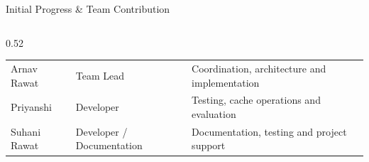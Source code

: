 \documentclass[aspectratio=169,10pt]{beamer}
\begin{document}
\begin{frame}{Initial Progress \& Team Contribution}
\begin{columns}[T]
\begin{column}{0.52\textwidth}
\begin{tabularx}{\textwidth}{
    @{}
    >{\raggedright\arraybackslash}p{1.45cm}
    >{\raggedright\arraybackslash}p{1.35cm}
    X
    @{}
}
Arnav Rawat &
Team Lead &
Coordination, architecture and implementation \\

Priyanshi &
Developer &
Testing, cache operations and evaluation \\

Suhani Rawat &
Developer / Documentation &
Documentation, testing and project support \\

\bottomrule

\end{tabularx}

\end{column}

\end{columns}

\end{frame}

\end{document}
